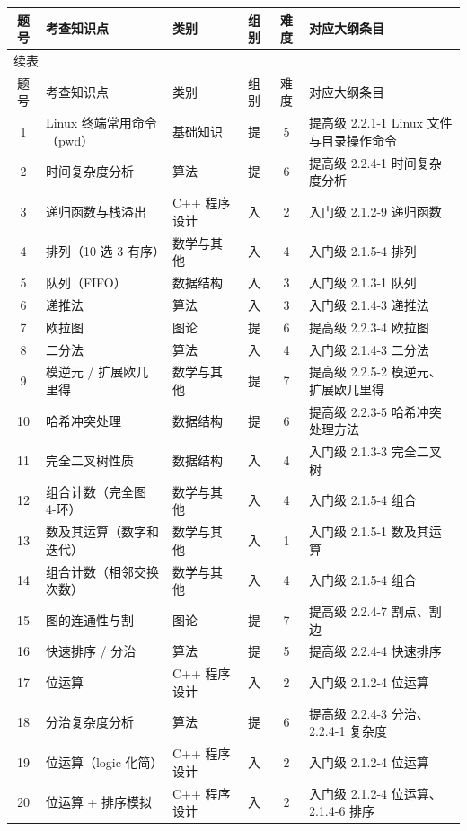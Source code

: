 \documentclass[11pt]{ctexart}
\begin{document}
\begingroup
\small
\begin{longtable}{cllccp{5.9cm}}
\toprule
题号 & 考查知识点 & 类别 & 组别 & 难度 & 对应大纲条目 \\
\midrule
\endfirsthead
\multicolumn{6}{l}{\footnotesize 续表}\\
\toprule
题号 & 考查知识点 & 类别 & 组别 & 难度 & 对应大纲条目 \\
\midrule
\endhead
1 & Linux 终端常用命令（pwd） & 基础知识 & 提 & 5 & 提高级 2.2.1-1 Linux 文件与目录操作命令 \\
2 & 时间复杂度分析 & 算法 & 提 & 6 & 提高级 2.2.4-1 时间复杂度分析 \\
3 & 递归函数与栈溢出 & C++ 程序设计 & 入 & 2 & 入门级 2.1.2-9 递归函数 \\
4 & 排列（10 选 3 有序） & 数学与其他 & 入 & 4 & 入门级 2.1.5-4 排列 \\
5 & 队列（FIFO） & 数据结构 & 入 & 3 & 入门级 2.1.3-1 队列 \\
6 & 递推法 & 算法 & 入 & 3 & 入门级 2.1.4-3 递推法 \\
7 & 欧拉图 & 图论 & 提 & 6 & 提高级 2.2.3-4 欧拉图 \\
8 & 二分法 & 算法 & 入 & 4 & 入门级 2.1.4-3 二分法 \\
9 & 模逆元 / 扩展欧几里得 & 数学与其他 & 提 & 7 & 提高级 2.2.5-2 模逆元、扩展欧几里得 \\
10 & 哈希冲突处理 & 数据结构 & 提 & 6 & 提高级 2.2.3-5 哈希冲突处理方法 \\
11 & 完全二叉树性质 & 数据结构 & 入 & 4 & 入门级 2.1.3-3 完全二叉树 \\
12 & 组合计数（完全图 4-环） & 数学与其他 & 入 & 4 & 入门级 2.1.5-4 组合 \\
13 & 数及其运算（数字和迭代） & 数学与其他 & 入 & 1 & 入门级 2.1.5-1 数及其运算 \\
14 & 组合计数（相邻交换次数） & 数学与其他 & 入 & 4 & 入门级 2.1.5-4 组合 \\
15 & 图的连通性与割 & 图论 & 提 & 7 & 提高级 2.2.4-7 割点、割边 \\
16 & 快速排序 / 分治 & 算法 & 提 & 5 & 提高级 2.2.4-4 快速排序 \\
17 & 位运算 & C++ 程序设计 & 入 & 2 & 入门级 2.1.2-4 位运算 \\
18 & 分治复杂度分析 & 算法 & 提 & 6 & 提高级 2.2.4-3 分治、2.2.4-1 复杂度 \\
19 & 位运算（logic 化简） & C++ 程序设计 & 入 & 2 & 入门级 2.1.2-4 位运算 \\
20 & 位运算 + 排序模拟 & C++ 程序设计 & 入 & 2 & 入门级 2.1.2-4 位运算、2.1.4-6 排序 \\

\end{longtable}
\end{document}

